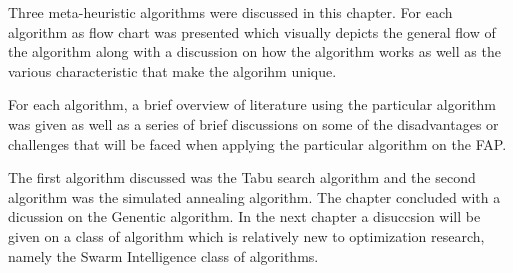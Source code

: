 Three meta-heuristic algorithms were discussed in this chapter. For each algorithm as flow chart was presented which visually depicts the general flow of the algorithm along with a discussion on how the algorithm works as well as the various characteristic that make the algorihm unique.

For each algorithm, a brief overview of literature using the particular algorithm was given as well as a series of brief discussions on some of the disadvantages or challenges that will be faced when applying the particular algorithm on the FAP.

The first algorithm discussed was the Tabu search algorithm and the second algorithm was the simulated annealing algorithm. The chapter concluded with a dicussion on the Genentic algorithm. In the next chapter a disuccsion will be given on a class of algorithm which is relatively new to optimization research, namely the Swarm Intelligence class of algorithms.
